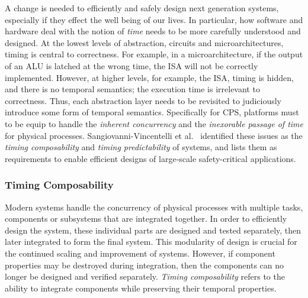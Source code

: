 A change is needed to efficiently and safely design next generation systems, especially if they effect the well being of our lives.
In particular, how software and hardware deal with the notion of \textit{time} needs to be more carefully understood and designed.
At the lowest levels of abstraction, circuits and microarchitectures, timing is central to correctness.
For example, in a microarchitecture, if the output of an ALU is latched at the wrong time, the ISA will not be correctly implemented.
However, at higher levels, for example, the ISA, timing is hidden, and there is no temporal semantics; the execution time is irrelevant to correctness. 
Thus, each abstraction layer needs to be revisited to judiciously introduce some form of temporal semantics. 
Specifically for CPS, platforms must to be equip to handle the \emph{inherent concurrency} and the \emph{inexorable passage of time} for physical processes.   
Sangiovanni-Vincentelli et al.~\cite{Sangiovanni-Vincentelli2007automotive} identified these issues as the \textit{timing composability} and \textit{timing predictability} of systems, and lists them as requirements to enable efficient designs of large-scale safety-critical applications.    

\subsubsection{Timing Composability}
Modern systems handle the concurrency of physical processes with multiple tasks, components or subsystems that are integrated together.    
In order to efficiently design the system, these individual parts are designed and tested separately, then later integrated to form the final system. 
This modularity of design is crucial for the continued scaling and improvement of systems.      
However, if component properties may be destroyed during integration, then the components can no longer be designed and verified separately. 
\textit{Timing composability} refers to the ability to integrate components while preserving their temporal properties.

